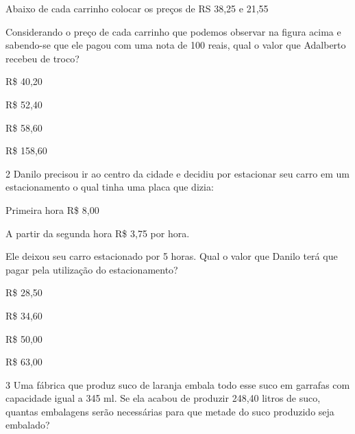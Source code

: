 

Abaixo de cada carrinho colocar os preços de RS 38,25 e 21,55

Considerando o preço de cada carrinho que podemos observar na figura
acima e sabendo-se que ele pagou com uma nota de 100 reais, qual o valor
que Adalberto recebeu de troco?

\begin{escolha}
\item
  R\$ 40,20
\item
  R\$ 52,40
\item
  R\$ 58,60
\item
  R\$ 158,60
\end{escolha}


\num{2} Danilo precisou ir ao centro da cidade e decidiu por estacionar seu
carro em um estacionamento o qual tinha uma placa que dizia:

Primeira hora R\$ 8,00

A partir da segunda hora R\$ 3,75 por hora.


Ele deixou seu carro estacionado por 5 horas. Qual o valor que Danilo
terá que pagar pela utilização do estacionamento?

\begin{escolha}
\item
  R\$ 28,50
\item
  R\$ 34,60
\item
  R\$ 50,00
\item
  R\$ 63,00
\end{escolha}


\num{3} Uma fábrica que produz suco de laranja embala todo esse suco em
garrafas com capacidade igual a 345 ml. Se ela acabou de produzir 248,40
litros de suco, quantas embalagens serão necessárias para que metade do
suco produzido seja embalado?

